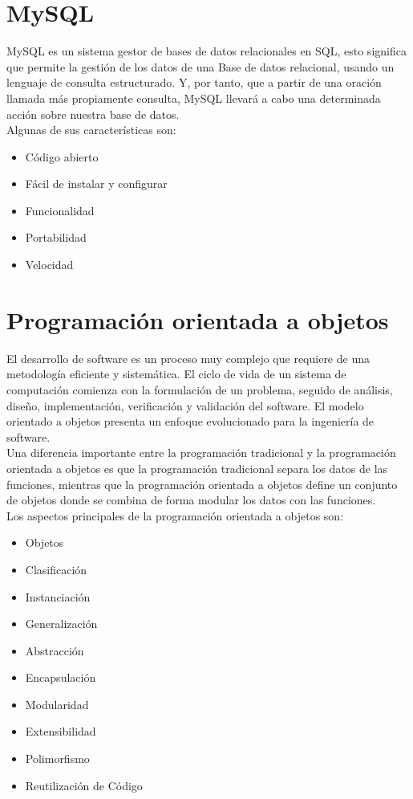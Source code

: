 \section{MySQL}
MySQL es un sistema gestor de bases de datos relacionales en SQL, esto significa que permite la gesti\'on de los datos de una Base de datos relacional, usando un lenguaje de consulta estructurado. Y, por tanto, que a partir de una oraci\'on llamada m\'as propiamente consulta, MySQL llevar\'a a cabo una determinada acci\'on sobre nuestra base de datos. \cite{mysql_server}\\

Algunas de sus caracter\'isticas son:
\begin{itemize}
\item C\'odigo abierto
\item F\'acil de instalar y configurar
\item Funcionalidad
\item Portabilidad
\item Velocidad
\end{itemize}

\section{Programaci\'on orientada a objetos}
El desarrollo de software es un proceso muy complejo que requiere de una metodolog\'ia eficiente y sistem\'atica. El ciclo de vida de un sistema de computaci\'on comienza con la formulaci\'on de un problema, seguido de an\'alisis, dise\~no, implementaci\'on, verificaci\'on y validaci\'on del software. El modelo orientado a objetos presenta un enfoque evolucionado para la ingenier\'ia de software.\\

Una diferencia importante entre la programaci\'on tradicional y la programaci\'on orientada a objetos es que la programaci\'on tradicional separa los datos de las funciones, mientras que la programaci\'on orientada a objetos define un conjunto de objetos donde se combina de forma modular los datos con las funciones. \cite{poo_deitel}\\

Los aspectos principales de la programaci\'on orientada a objetos son:
\begin{itemize}
\item Objetos
\item Clasificaci\'on
\item Instanciaci\'on
\item Generalizaci\'on
\item Abstracci\'on
\item Encapsulaci\'on
\item Modularidad
\item Extensibilidad
\item Polimorfismo
\item Reutilizaci\'on de C\'odigo
\end{itemize}

